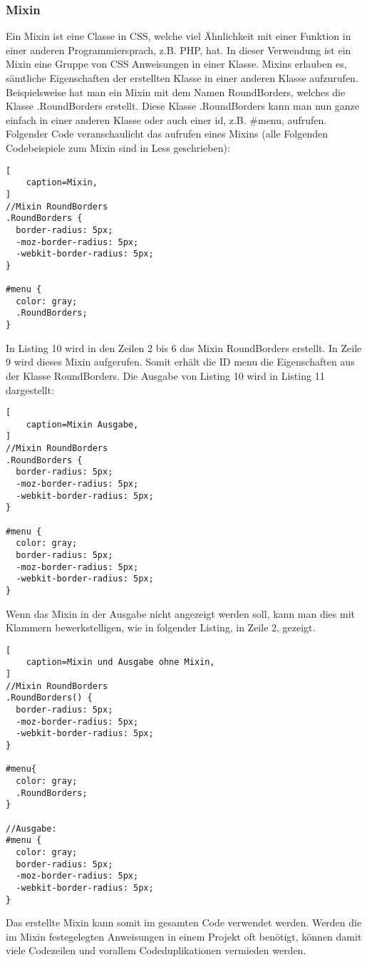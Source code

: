 \subsubsection{Mixin}
Ein Mixin ist eine Classe in CSS, welche viel Ähnlichkeit mit einer Funktion in einer anderen Programmiersprach, z.B. PHP, hat.\newline 
In dieser Verwendung ist ein Mixin eine Gruppe von CSS Anweisungen in einer Klasse. Mixins erlauben es, sämtliche Eigenschaften der erstellten Klasse in einer anderen Klasse aufzurufen.\newline
Beispielsweise hat man ein Mixin mit dem Namen RoundBorders, welches die Klasse .RoundBorders erstellt. Diese Klasse .RoundBorders kann man nun ganze einfach in einer anderen Klasse oder auch einer id, z.B. \#menu, aufrufen.\autocite[]{Gerchev.2012}\newline
Folgender Code veranschaulicht das aufrufen eines Mixins (alle Folgenden Codebeispiele zum Mixin sind in Less geschrieben):
\begin{lstlisting}[
	caption=Mixin,
]
//Mixin RoundBorders
.RoundBorders {
  border-radius: 5px;
  -moz-border-radius: 5px;
  -webkit-border-radius: 5px;
}

#menu {
  color: gray;
  .RoundBorders;
}
\end{lstlisting}
In Listing 10 wird in den Zeilen 2 bis 6 das Mixin RoundBorders erstellt. In Zeile 9 wird dieses Mixin aufgerufen. Somit erhält die ID menu die Eigenschaften aus der Klasse RoundBorders.
Die Ausgabe von Listing 10 wird in Listing 11 dargestellt:
\begin{lstlisting}[
	caption=Mixin Ausgabe,
]
//Mixin RoundBorders
.RoundBorders {
  border-radius: 5px;
  -moz-border-radius: 5px;
  -webkit-border-radius: 5px;
}

#menu {
  color: gray;
  border-radius: 5px;
  -moz-border-radius: 5px;
  -webkit-border-radius: 5px;
}
\end{lstlisting}

Wenn das Mixin in der Ausgabe nicht angezeigt werden soll, kann man dies mit Klammern bewerkstelligen, wie in folgender Listing, in Zeile 2, gezeigt.\autocite[]{thecorelessteam.}\newline
\begin{lstlisting}[
	caption=Mixin und Ausgabe ohne Mixin,
]
//Mixin RoundBorders
.RoundBorders() {
  border-radius: 5px;
  -moz-border-radius: 5px;
  -webkit-border-radius: 5px;
}

#menu{
  color: gray;
  .RoundBorders;
}

//Ausgabe:
#menu {
  color: gray;
  border-radius: 5px;
  -moz-border-radius: 5px;
  -webkit-border-radius: 5px;
}
\end{lstlisting}
Das erstellte Mixin kann somit im gesamten Code verwendet werden. Werden die im Mixin festegelegten Anweisungen in einem Projekt oft benötigt, können damit viele Codezeilen und vorallem Codeduplikationen vermieden werden.

